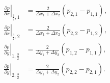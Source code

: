 \documentclass{article}
\numberwithin{equation}{section}
\begin{document}
$$
\begin{aligned}
\left.\frac{\partial p}{\partial x}\right|_{\frac{3}{2},1} & = \frac{2}{\Delta x_1+\Delta x_2}\left(p_{2,1}-p_{1,1}\right), \\
\left.\frac{\partial p}{\partial x}\right|_{\frac{3}{2},2} & = \frac{2}{\Delta x_1+\Delta x_2}\left(p_{2,2}-p_{1,2}\right), \\
\left.\frac{\partial p}{\partial y}\right|_{1,\frac{3}{2}} & = \frac{2}{\Delta y_1+\Delta y_2}\left(p_{1,2}-p_{1,1}\right), \\
\left.\frac{\partial p}{\partial y}\right|_{2,\frac{3}{2}} & = \frac{2}{\Delta y_1+\Delta y_2}\left(p_{2,2}-p_{2,1}\right) .
\end{aligned}
$$
\end{document}
